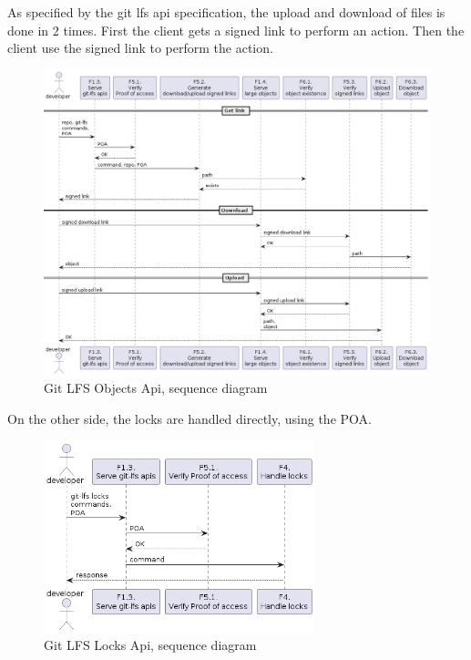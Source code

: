 As specified by the git lfs api specification, the upload and download of files is done in 2 times. First the client gets a signed link to perform an action. Then the client use the signed link to perform the action.

\begin{figure}[H]
    \centering
    \includegraphics[width=\textwidth]{design/diagrams/signed_link_flow_serve_seq.png}
    \caption{Git LFS Objects Api, sequence diagram}
    \label{fig:signed_link_flow_serve_seq}
\end{figure}

On the other side, the locks are handled directly, using the POA.

\begin{figure}[H]
    \centering
    \includegraphics[width=0.7\textwidth]{design/diagrams/signed_link_flow_locks_seq.png}
    \caption{Git LFS Locks Api, sequence diagram}
    \label{fig:signed_link_flow_locks_seq}
\end{figure}
